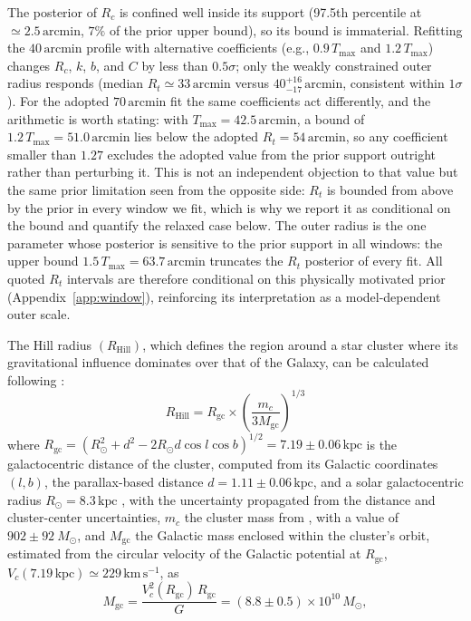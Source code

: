\documentclass{aa}
\begin{document}
The posterior of $R_c$ is confined well inside its support (97.5th percentile at $\simeq2.5\,\mathrm{arcmin}$, $7\%$ of the prior upper bound), so its bound is immaterial. Refitting the $40\,\mathrm{arcmin}$ profile with alternative coefficients (e.g., $0.9\,T_{\mathrm{max}}$ and $1.2\,T_{\mathrm{max}}$) changes $R_c$, $k$, $b$, and $C$ by less than $0.5\sigma$; only the weakly constrained outer radius responds (median $R_t\simeq33\,\mathrm{arcmin}$ versus $40^{+16}_{-17}\,\mathrm{arcmin}$, consistent within $1\sigma$). For the adopted $70\,\mathrm{arcmin}$ fit the same coefficients act differently, and the arithmetic is worth stating: with $T_{\mathrm{max}}=42.5\,\mathrm{arcmin}$, a bound of $1.2\,T_{\mathrm{max}}=51.0\,\mathrm{arcmin}$ lies below the adopted $R_t=54\,\mathrm{arcmin}$, so any coefficient smaller than $1.27$ excludes the adopted value from the prior support outright rather than perturbing it. This is not an independent objection to that value but the same prior limitation seen from the opposite side: $R_t$ is bounded from above by the prior in every window we fit, which is why we report it as conditional on the bound and quantify the relaxed case below. The outer radius is the one parameter whose posterior is sensitive to the prior support in all windows: the upper bound $1.5\,T_{\mathrm{max}}=63.7\,\mathrm{arcmin}$ truncates the $R_t$ posterior of every fit. All quoted $R_t$ intervals are therefore conditional on this physically motivated prior (Appendix~\ref{app:window}), reinforcing its interpretation as a model-dependent outer scale.

The Hill radius $(R_\mathrm{Hill})$, which defines the region around a star cluster where its gravitational influence dominates over that of the Galaxy, can be calculated following \citet{2019A&A...627A.119C}:
\begin{equation}
R_\mathrm{Hill} = R_{\mathrm{gc}} \times \left(\frac{m_c}{3M_{\mathrm{gc}}}\right)^{1/3}
\end{equation}
where $R_{\mathrm{gc}} = \left(R_\odot^{2} + d^{2} - 2 R_\odot d \cos l \cos b\right)^{1/2} = 7.19 \pm 0.06\,\mathrm{kpc}$ is the galactocentric distance of the cluster, computed from its Galactic coordinates $(l,b)$, the parallax-based distance $d = 1.11 \pm 0.06\,\mathrm{kpc}$, and a solar galactocentric radius $R_\odot = 8.3\,\mathrm{kpc}$ \citep{2016ApJS..227....5D}, with the uncertainty propagated from the distance and cluster-center uncertainties, $ m_c $ the cluster mass from \citet{2024arXiv240305143H}, with a value of $902 \pm 92~M_\odot$, and $ M_{\mathrm{gc}} $ the Galactic mass enclosed within the cluster's orbit, estimated from the circular velocity of the \citet{2017MNRAS.465...76M} Galactic potential at $R_{\mathrm{gc}}$, $V_c(7.19\,\mathrm{kpc}) \simeq 229\,\mathrm{km\,s^{-1}}$, as
\begin{equation}
	M_{\mathrm{gc}} = \frac{V_c^2(R_{\mathrm{gc}})\, R_{\mathrm{gc}}}{G} = (8.8 \pm 0.5) \times 10^{10}\,M_\odot,
\end{equation}
\end{document}

